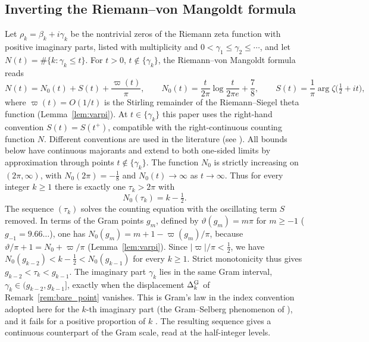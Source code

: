 \documentclass[11pt,a4paper]{article}
\makeatletter
\numberwithin{equation}{section}
\DeclareRobustCommand{\CGref}[1]{\ref{#1}}
\DeclareRobustCommand{\CGcite}[2][]{\if\relax\detokenize{#1}\relax\cite{#2}\else\cite[#1]{#2}\fi}
\let\CG@origref\ref
\newcommand{\CG@gettip}[1]{\@ifundefined{CGTip@#1}{#1}{\csname CGTip@#1\endcsname}}
\newcommand{\CG@getbib}[1]{\@ifundefined{CGBib@#1}{#1}{\csname CGBib@#1\endcsname}}
\DeclareRobustCommand{\CGref}[1]{\pdftooltip{\CG@origref{#1}}{\CG@gettip{#1}}}
\DeclareRobustCommand{\CGcite}[2][]{\pdftooltip{\if\relax\detokenize{#1}\relax\cite{#2}\else\cite[#1]{#2}\fi}{\CG@getbib{#2}}}
\theoremstyle{definition}
\theoremstyle{remark}
\newcommand{\Nz}{N_0} %
\makeatother
\begin{document}
\subsection{Inverting the Riemann--von Mangoldt formula}\label{subsec:tau_intro}
Let $\rho_k=\beta_k+i\gamma_k$ be the nontrivial zeros of the Riemann zeta function with positive imaginary parts, listed with multiplicity and $0<\gamma_1\le\gamma_2\le\cdots$, and let $N(t)=\#\{k:\gamma_k\le t\}$. For $t>0$, $t\notin\{\gamma_k\}$, the Riemann--von Mangoldt formula reads \CGcite[\S9.3]{Titchmarsh1986}
\begin{equation}
N(t)=\Nz(t)+S(t)+\frac{\varpi(t)}\pi,\qquad \Nz(t)=\frac t{2\pi}\log\frac t{2\pi e}+\frac78,\qquad S(t)=\frac1\pi\arg\zeta\bigl(\tfrac12+it\bigr),
\label{eq:intro_RvM}
\end{equation}
where $\varpi(t)=O(1/t)$ is the Stirling remainder of the Riemann--Siegel theta function (Lemma~\CGref{lem:varpi}). At $t\in\{\gamma_k\}$ this paper uses the right-hand convention $S(t)=S(t^+)$, compatible with the right-continuous counting function $N$. Different conventions are used in the literature (see \CGcite[\S9.3]{Titchmarsh1986}). All bounds below have continuous majorants and extend to both one-sided limits by approximation through points $t\notin\{\gamma_k\}$. The function $\Nz$ is strictly increasing on $(2\pi,\infty)$, with $\Nz(2\pi)=-\frac18$ and $\Nz(t)\to\infty$ as $t\to\infty$. Thus for every integer $k\ge1$ there is exactly one $\tau_k>2\pi$ with
\begin{equation}
\Nz(\tau_k)=k-\tfrac12 .
\label{eq:intro_tau}
\end{equation}
The sequence $(\tau_k)$ solves the counting equation with the oscillating term $S$ removed. In terms of the Gram points $g_m$, defined by $\vartheta(g_m)=m\pi$ for $m\ge-1$ ($g_{-1}=9.66\ldots$), one has $\Nz(g_m)=m+1-\varpi(g_m)/\pi$, because $\vartheta/\pi+1=\Nz+\varpi/\pi$ (Lemma~\CGref{lem:varpi}). Since $|\varpi|/\pi<\frac12$, we have $\Nz(g_{k-2})<k-\frac12<\Nz(g_{k-1})$ for every $k\ge1$. Strict monotonicity thus gives $g_{k-2}<\tau_k<g_{k-1}$. The imaginary part $\gamma_k$ lies in the same Gram interval, $\gamma_k\in(g_{k-2},g_{k-1}]$, exactly when the displacement $\Delta^{\rm G}_k$ of Remark~\CGref{rem:bare_point} vanishes. This is Gram's law in the index convention adopted here for the $k$-th imaginary part (the Gram--Selberg phenomenon of \CGcite[Def.~1.4]{Korolev2012}), and it fails for a positive proportion of $k$ \CGcite[p.~58]{Korolev2012}. The resulting sequence gives a continuous counterpart of the Gram scale, read at the half-integer levels.
\end{document}
